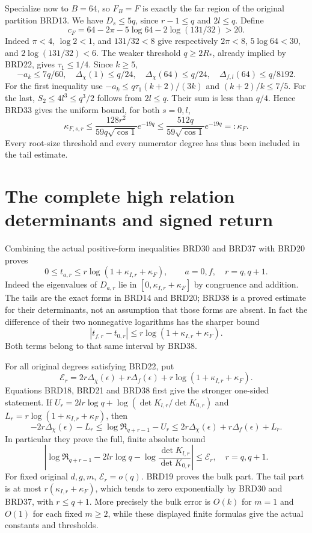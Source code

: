 Specialize now to $B=64$, so $F_B=F$ is exactly the far region
of the original partition BRD13. We have $D_s\leq5q$, since $r-1\leq q$ and
$2l\leq q$. Define
\[
 c_F=64-2\pi-5\log64-2\log(131/32)>20.
\tag{BRD35}
\]
Indeed $\pi<4$, $\log2<1$, and $131/32<8$ give respectively
$2\pi<8$, $5\log64<30$, and $2\log(131/32)<6$.
The weaker threshold $q\geq2R_*$, already implied by BRD22,
gives $\tau_1\leq1/4$. Since $k\geq5$,
\[
 -a_k\leq7q/60,\quad \Delta_\chi(1)\leq q/24,
 \quad\Delta_\chi(64)\leq q/24,
 \quad\Delta_{f,l}(64)\leq q/8192.
\tag{BRD36}
\]
For the first inequality use
$-a_k\leq q\tau_1(k+2)/(3k)$ and $(k+2)/k\leq7/5$.
For the last, $S_2\leq4l^3\leq q^3/2$ follows from
$2l\leq q$. Their sum is less than $q/4$. Hence BRD33 gives
the uniform bound, for both $s=0,l$,
\[
 \kappa_{F,s,r}\leq
 \frac{128r^2}{59q\sqrt{\cos1}}e^{-19q}
 \leq\frac{512q}{59\sqrt{\cos1}}e^{-19q}
 =:\kappa_F.
\tag{BRD37}
\]
Every root-size threshold and every numerator degree has thus
been included in the tail estimate.

\section{The complete high relation determinants and signed return}

Combining the actual positive-form inequalities BRD30 and BRD37
with BRD20 proves
\[
 0\leq t_{a,r}\leq r\log(1+\kappa_{I,r}+\kappa_F),
 \qquad a=0,f,\quad r=q,q+1.
\tag{BRD38}
\]
Indeed the eigenvalues of $D_{a,r}$ lie in
$[0,\kappa_{I,r}+\kappa_F]$ by congruence and addition.
The tails are the exact forms in BRD14 and BRD20; BRD38 is a
proved estimate for their determinants, not an assumption that
those forms are absent. In fact the difference of their two
nonnegative logarithms has the sharper bound
\[
 |t_{f,r}-t_{0,r}|\leq r\log(1+\kappa_{I,r}+\kappa_F).
\tag{BRD39}
\]
Both terms belong to that same interval by BRD38.

For all original degrees satisfying BRD22, put
\[
 \mathcal E_r=2r\Delta_\chi(\epsilon)+r\Delta_f(\epsilon)
              +r\log(1+\kappa_{I,r}+\kappa_F).
\tag{BRD40}
\]
Equations BRD18, BRD21 and BRD38 first give the stronger
one-sided statement. If
$U_r=2lr\log q+\log(\det K_{l,r}/\det K_{0,r})$ and
$L_r=r\log(1+\kappa_{I,r}+\kappa_F)$, then
\[
 -2r\Delta_\chi(\epsilon)-L_r
 \leq\log\mathfrak R_{q+r-1}-U_r
 \leq2r\Delta_\chi(\epsilon)+r\Delta_f(\epsilon)+L_r.
\tag{BRD41a}
\]
In particular they prove the full, finite absolute bound
\[
 \boxed{\left|\log\mathfrak R_{q+r-1}
    -2lr\log q-\log\frac{\det K_{l,r}}{\det K_{0,r}}
       \right|\leq\mathcal E_r,
       \quad r=q,q+1.}
\tag{BRD41}
\]
For fixed original $d,g,m$, $\mathcal E_r=o(q)$.
BRD19 proves the bulk part. The tail part is at most
$r(\kappa_{I,r}+\kappa_F)$, which tends to zero exponentially
by BRD30 and BRD37, with $r\leq q+1$.
More precisely the bulk error is $O(k)$ for $m=1$ and
$O(1)$ for each fixed $m\geq2$, while these displayed finite
formulas give the actual constants and thresholds.

